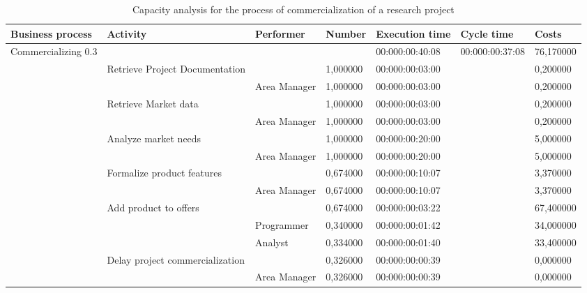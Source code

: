 \begin{landscape}
\centering
\begin{table}
{\tiny
\begin{tabular}{|l|l|l|l|l|l|l|}
Business process&Activity&Performer&Number&Execution time&Cycle
time&Costs\\
\hline
Commercializing 0.3&&&&00:000:00:40:08&00:000:00:37:08&76,170000\\
\hline
&Retrieve Project Documentation &&1,000000&00:000:00:03:00&&0,200000\\
\hline
&&Area Manager &1,000000&00:000:00:03:00&&0,200000\\
\hline
&Retrieve Market data &&1,000000&00:000:00:03:00&&0,200000\\
\hline
&&Area Manager &1,000000&00:000:00:03:00&&0,200000\\
\hline
&Analyze market needs &&1,000000&00:000:00:20:00&&5,000000\\
\hline
&&Area Manager &1,000000&00:000:00:20:00&&5,000000\\
\hline
&Formalize product features &&0,674000&00:000:00:10:07&&3,370000\\
\hline
&&Area Manager &0,674000&00:000:00:10:07&&3,370000\\
\hline
&Add product to offers &&0,674000&00:000:00:03:22&&67,400000\\
\hline
&&Programmer &0,340000&00:000:00:01:42&&34,000000\\
\hline
&&Analyst &0,334000&00:000:00:01:40&&33,400000\\
\hline
&Delay project commercialization &&0,326000&00:000:00:00:39&&0,000000\\
\hline
&&Area Manager &0,326000&00:000:00:00:39&&0,000000\\
\hline
\end{tabular}
}
\caption{Capacity analysis for the process of commercialization of a
research project}
\label{2tab:commerc}
\end{table}
\end{landscape}



